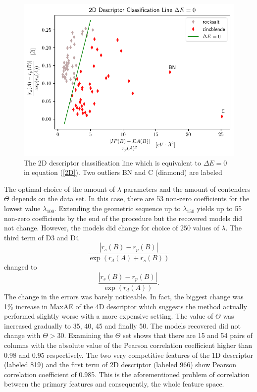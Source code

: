 \documentclass[11pt,oneside,czech,american]{book} %
\theoremstyle{plain}
\theoremstyle{definition}
\begin{document}
\begin{figure}[H]
	\includegraphics[scale=1]{lasso.pdf}
	\caption{The 2D descriptor classification line which is equivalent to $\Delta E = 0$ in equation (\ref{2D}). Two outliers BN and C (diamond) are labeled}
	\label{line}
\end{figure}
The optimal choice of the amount of $\lambda$ parameters and the amount of contenders $\Theta$ depends on the data set. In this case, there are 53 non-zero coefficients for the lowest value $\lambda_{100}$. Extending the geometric sequence up to $\lambda_{150}$ yields up to 55 non-zero coefficients by the end of the procedure but the recovered models did not change. However, the models did change for choice of 250 values of $\lambda$. The third term of D3 and D4 $$\frac{|r_s(B)-r_p(B)|}{\exp(r_d(A)+r_s(B))}$$ changed to 
$$\frac{|r_s(B)-r_p(B)|}{\exp(r_d(A))}.$$
The change in the errors was barely noticeable. In fact, the biggest change was 1\% increase in MaxAE of the 4D descriptor which suggests the method actually performed slightly worse with a more expensive setting.
The value of $\Theta$ was increased gradually to 35, 40, 45 and finally 50. The models recovered did not change with $\Theta > 30$. Examining the $\Theta$ set shows that there are 15 and 54 pairs of columns with the absolute value of the Pearson correlation coefficient higher than 0.98 and 0.95 respectively. The two very competitive features of the 1D descriptor (labeled 819) and the first term of 2D descriptor (labeled 966) show Pearson correlation coefficient of 0.985. This is the aforementioned problem of correlation between the primary features and consequently, the whole feature space.
\end{document}
